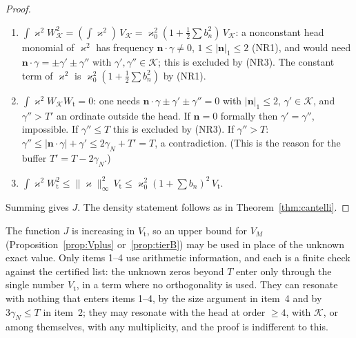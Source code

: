 \documentclass[11pt]{amsart}
\theoremstyle{definition}
\numberwithin{equation}{section}
\newcommand{\cK}{\mathcal K}          %
\begin{document}
\begin{proof}
\begin{enumerate}
\item[3.] $\int\varkappa^2W_{\cK}^2=(\int\varkappa^2)\,V_{\cK}
=\varkappa_0^2(1+\tfrac12\sum b_n^2)\,V_{\cK}$: a nonconstant head
monomial of $\varkappa^2$ has frequency $\mathbf n\cdot\gamma\ne0$,
$1\le|\mathbf n|_1\le2$ (NR1), and would need
$\mathbf n\cdot\gamma=\pm\gamma'\pm\gamma''$ with
$\gamma',\gamma''\in\cK$; this is excluded by (NR3). The constant
term of $\varkappa^2$ is $\varkappa_0^2(1+\tfrac12\sum b_n^2)$ by
(NR1).
\item[4.] $\int\varkappa^2W_{\cK}W_{\mathrm t}=0$: one needs
$\mathbf n\cdot\gamma\pm\gamma'\pm\gamma''=0$ with
$|\mathbf n|_1\le2$, $\gamma'\in\cK$, and $\gamma''>T'$ an ordinate
outside the head. If $\mathbf n=0$ formally then $\gamma'=\gamma''$,
impossible. If $\gamma''\le T$ this is excluded by (NR3). If
$\gamma''>T$: $\gamma''\le|\mathbf n\cdot\gamma|+\gamma'
\le2\gamma_N+T'=T$, a contradiction. (This is the reason for the
buffer $T'=T-2\gamma_N$.)
\item[5.] $\int\varkappa^2W_{\mathrm t}^2
\le\|\varkappa\|_\infty^2\,V_{\mathrm t}
\le\varkappa_0^2(1+\sum b_n)^2\,V_{\mathrm t}$.
\end{enumerate}
Summing gives $J$. The density statement follows as in
Theorem~\ref{thm:cantelli}.
\end{proof}

The function $J$ is increasing in $V_{\mathrm t}$, so an upper bound
for $V_M$ (Proposition~\ref{prop:Vplus} or~\ref{prop:tierB}) may be
used in place of the unknown exact value. Only items 1--4 use
arithmetic information, and each is a finite check against the
certified list: the unknown zeros beyond $T$ enter only through the
single number $V_{\mathrm t}$, in a term where no orthogonality is
used. They can resonate with nothing that enters items 1--4, by the
size argument in item~4 and by $3\gamma_N\le T$ in item~2; they may
resonate with the head at order $\ge4$, with $\cK$, or among
themselves, with any multiplicity, and the proof is indifferent to
this.
\end{document}
